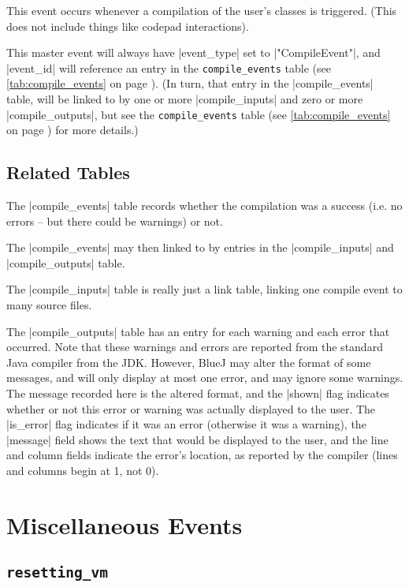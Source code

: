 \documentclass{book}
\newcommand{\myref}[1]{\autoref{#1} on page \pageref*{#1}}
\newcommand{\tabref}[1]{\lstinline|#1| table (see \myref{tab:#1})}
\begin{document}
This event occurs whenever a compilation of the user's classes is triggered.
(This does not include things like codepad interactions).

This master event will always have |event_type| set to |"CompileEvent"|, and
|event_id| will reference an entry in the \tabref{compile_events}.  (In turn,
that entry in the |compile_events| table, will be linked to by one or more
|compile_inputs| and zero or more |compile_outputs|, but see the
\tabref{compile_events} for more details.)

\subsection{Related Tables}

The |compile_events| table records whether the compilation was a success
(i.e. no errors -- but there could be warnings) or not.


The |compile_events| may then linked to by entries in the |compile_inputs| and
|compile_outputs| table.

The |compile_inputs| table is really just a link table, linking one compile
event to many source files.


The |compile_outputs| table has an entry for each warning and each error that
occurred.  Note that these warnings and errors are reported from the standard Java
compiler from the JDK.  However, BlueJ may alter the format of some messages,
and will only display at most one error, and may ignore some warnings.  The
message recorded here is the altered format, and the |shown| flag indicates
whether or not this error or warning was actually displayed to the user.  The
|is_error| flag indicates if it was an error (otherwise it was a warning), the
|message| field shows the text that would be displayed to the user, and the
line and column fields indicate the error's location, as reported by the
compiler  (lines and columns begin at 1, not 0).


\section{Miscellaneous Events}

\subsection{\lstinline|resetting_vm|}
\end{document}
